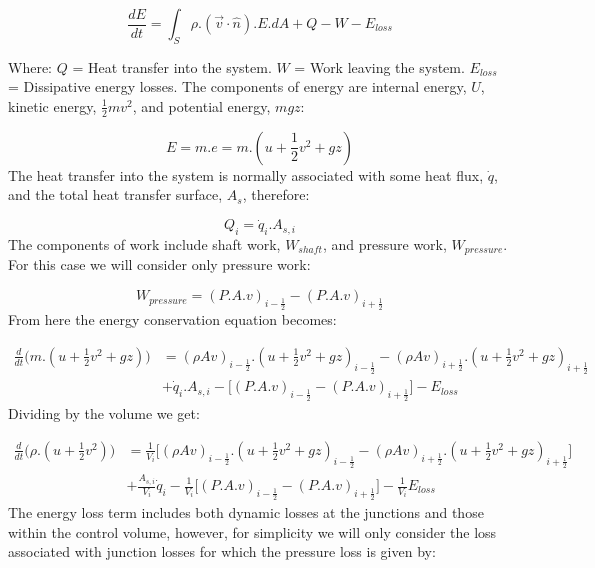 \documentclass[11pt,letterpaper,titlepage]{article}
\newcommand{\half}{\frac{1}{2}}
\begin{document}
\begin{equation*}
\frac{dE}{dt}=\int_S \rho.(\vec{v}\cdot \hat{n}).E.dA + Q - W -E_{loss}
\end{equation*}

\noindent 
Where: 
\newline \noindent $Q$ \quad = Heat transfer into the system.
\newline \noindent $W$ \quad = Work leaving the system.
\newline \noindent $E_{loss}$ \quad = Dissipative energy losses.
\newline
\newline
The components of energy are internal energy, $U$, kinetic energy, $\half mv^2$, and potential energy, $mgz$:

\begin{equation*}
E= m.e = m.(u+\half v^2+gz)
\end{equation*}
\newline
The heat transfer into the system is normally associated with some heat flux, $\dot{q}$, and the total heat transfer surface, $A_s$, therefore:

\begin{equation*}
Q_i=\dot{q}_i.A_{s,i}
\end{equation*}
\newline
The components of work include shaft work, $W_{shaft}$, and pressure work, $W_{pressure}$. For this case we will consider only pressure work:

\begin{equation*}
W_{pressure}=(P.A.v)_{i-\half} - (P.A.v)_{i+\half}
\end{equation*}
\newline
\noindent
From here the energy conservation equation becomes:

\begin{equation*}
\begin{aligned}
\frac{d}{dt} \biggr( m.(u+\half v^2+gz) \biggr)&=(\rho Av)_{i-\half}.(u+\half v^2+gz)_{i-\half} - (\rho Av)_{i+\half}.(u+\half v^2+gz)_{i+\half} \\
&+\dot{q}_i.A_{s,i} - \biggr[   (P.A.v)_{i-\half} - (P.A.v)_{i+\half}   \biggr] - E_{loss}
\end{aligned}
\end{equation*}
\newline
\noindent
Dividing by the volume we get:

\begin{equation}
\begin{aligned}
\frac{d}{dt} \biggr( \rho.(u+\half v^2) \biggr)&=\frac{1}{V_i}\biggr[ (\rho Av)_{i-\half}.(u+\half v^2+gz)_{i-\half} - (\rho Av)_{i+\half}.(u+\half v^2+gz)_{i+\half} \biggr] \\
&+\frac{A_{s,i}}{V_i}\dot{q}_i - \frac{1}{V_i}\biggr[   (P.A.v)_{i-\half} - (P.A.v)_{i+\half}   \biggr] - \frac{1}{V_i}E_{loss}
\end{aligned}
\end{equation}
\newline
\noindent The energy loss term includes both dynamic losses at the junctions and those within the control volume, however, for simplicity we will only consider the loss associated with junction losses for which the pressure loss is given by:
\end{document}
